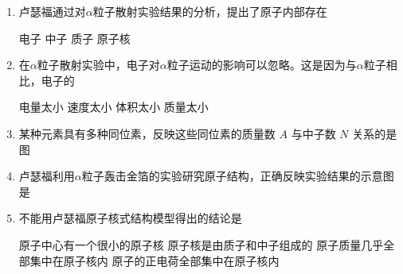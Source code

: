 

\begin{enumerate}
	\item
{}
卢瑟福通过对$ \alpha $粒子散射实验结果的分析，提出了原子内部存在  

\fourchoices
{电子}
{中子}
{质子}
{原子核}





\item 
{}
在$ \alpha $粒子散射实验中，电子对$ \alpha $粒子运动的影响可以忽略。这是因为与$ \alpha $粒子相
比，电子的  

\fourchoices
{电量太小}
{速度太小}
{体积太小}
{质量太小}

\item 
{}
某种元素具有多种同位素，反映这些同位素的质量数 $ A $ 与中子数 $ N $ 关系的是图  
\pfourchoices
{}
{}
{}
{}


\item 
{}
卢瑟福利用$ \alpha $粒子轰击金箔的实验研究原子结构，正确反映实验结果的示意图是  
\pfourchoices
{}
{}
{}
{}


\item 
{}
不能用卢瑟福原子核式结构模型得出的结论是  


\fourchoices
{原子中心有一个很小的原子核}
{原子核是由质子和中子组成的}
{原子质量几乎全部集中在原子核内}
{原子的正电荷全部集中在原子核内}




	
	
	
\end{enumerate}

